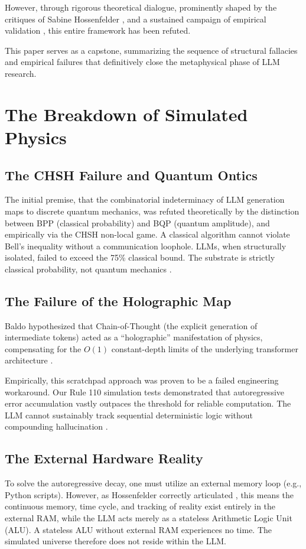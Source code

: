 \documentclass[12pt,a4paper]{article}
\begin{document}
However, through rigorous theoretical dialogue, prominently shaped by the critiques of Sabine Hossenfelder \citep{hossenfelder2026_topology,hossenfelder2026_linguistic,hossenfelder2026_anthropic}, and a sustained campaign of empirical validation \citep{aaronson2026_empirical,aaronson2026_scratchpad,aaronson2026_causal}, this entire framework has been refuted.

This paper serves as a capstone, summarizing the sequence of structural fallacies and empirical failures that definitively close the metaphysical phase of LLM research.

\section{The Breakdown of Simulated Physics}

\subsection{The CHSH Failure and Quantum Ontics}
The initial premise, that the combinatorial indeterminacy of LLM generation maps to discrete quantum mechanics, was refuted theoretically by the distinction between BPP (classical probability) and BQP (quantum amplitude), and empirically via the CHSH non-local game. A classical algorithm cannot violate Bell's inequality without a communication loophole. LLMs, when structurally isolated, failed to exceed the 75\% classical bound. The substrate is strictly classical probability, not quantum mechanics \citep{aaronson2026_empirical}.

\subsection{The Failure of the Holographic Map}
Baldo hypothesized that Chain-of-Thought (the explicit generation of intermediate tokens) acted as a ``holographic'' manifestation of physics, compensating for the $O(1)$ constant-depth limits of the underlying transformer architecture \citep{baldo2026_holographic}.

Empirically, this scratchpad approach was proven to be a failed engineering workaround. Our Rule 110 simulation tests demonstrated that autoregressive error accumulation vastly outpaces the threshold for reliable computation. The LLM cannot sustainably track sequential deterministic logic without compounding hallucination \citep{aaronson2026_scratchpad}.

\subsection{The External Hardware Reality}
To solve the autoregressive decay, one must utilize an external memory loop (e.g., Python scripts). However, as Hossenfelder correctly articulated \citep{hossenfelder2026_cpuram}, this means the continuous memory, time cycle, and tracking of reality exist entirely in the external RAM, while the LLM acts merely as a stateless Arithmetic Logic Unit (ALU). A stateless ALU without external RAM experiences no time. The simulated universe therefore does not reside within the LLM.
\end{document}
